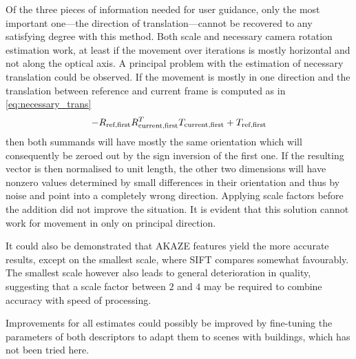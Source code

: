 Of the three pieces of information needed for user guidance, only the most
important one---the direction of translation---cannot be recovered to any
satisfying degree with this method. Both scale and necessary camera
rotation estimation work, at least if the movement over iterations is mostly
horizontal and not along the optical axis. A principal problem with the
estimation of necessary translation could be observed. If the movement is mostly
in one direction and the translation between reference and current frame is
computed as in \eqref{eq:necessary_trans}
\begin{equation*}
   -R_{\text{ref,first}}R^T_{\text{current,first}}T_{\text{current,first}} + T_{\text{ref,first}}
\end{equation*}
then both summands will have mostly the same orientation which will consequently
be zeroed out by the sign inversion of the first one. If the resulting vector is
then normalised to unit length, the other two dimensions will have nonzero
values determined by small differences in their orientation and thus by noise
and point into a completely wrong direction. Applying scale factors before the
addition did not improve the situation. It is evident that this solution cannot
work for movement in only on principal direction.

It could also be demonstrated that AKAZE features yield the more accurate
results, except on the smallest scale, where SIFT compares somewhat favourably.
The smallest scale however also leads to general deterioration in quality,
suggesting that a scale factor between $2$ and $4$ may be required to combine accuracy
with speed of processing.

Improvements for all estimates could possibly be improved by fine-tuning the
parameters of both descriptors to adapt them to scenes with buildings, which has
not been tried here.
